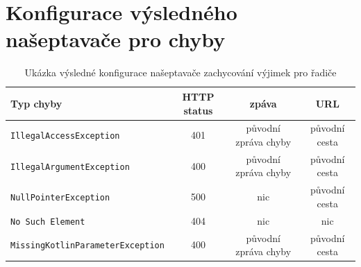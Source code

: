 \chapter{Konfigurace výsledného našeptavače pro chyby}\label{dodatek:excpetion-handler2}
    \begin{table} \centering
            \caption[Konfigurace výsledného našeptavače pro řadiče]{Ukázka výsledné konfigurace našeptavače zachycování výjimek pro řadiče}
            \begin{tabular}{|l|c|c|c|}\hline
        	  Typ chyby		& HTTP status		& zpáva	& URL 	\tabularnewline \hline \hline
        	  \texttt{IllegalAccessException}	& 401	& původní zpráva chyby		& původní cesta     \tabularnewline \hline
        	  \texttt{IllegalArgumentException}	& 400	& původní zpráva chyby		& původní cesta     \tabularnewline \hline
        	  \texttt{NullPointerException}	& 500	& nic		& původní cesta     \tabularnewline \hline
        	  \texttt{No Such Element}	& 404	& nic		& nic     \tabularnewline \hline
        	  \texttt{MissingKotlinParameterException}	& 400	& původní zpráva chyby		& původní cesta     \tabularnewline \hline
            \end{tabular}
    \end{table}

